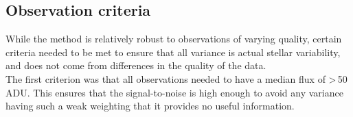 \subsection{Observation criteria}
\label{secCriteria}
While the method is relatively robust to observations of varying quality, certain criteria needed to be met to ensure that all variance is actual stellar variability, and does not come from differences in the quality of the data.\\

The first criterion was that all observations needed to have a median flux of \textgreater\,50 ADU. This ensures that the signal-to-noise is high enough to avoid any variance having such a weak weighting that it provides no useful information.\\

\begin{figure}
	\hspace{-3cm}
	\captionsetup{width=.5\textwidth}
    \caption{}
    \label{figGL667C_ISV}
\end{figure}

